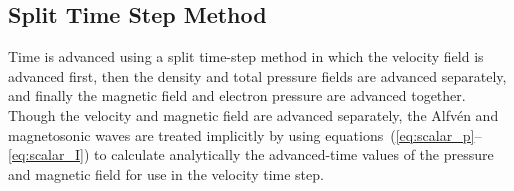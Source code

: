 \documentclass[letterpaper]{book}
\begin{document}
\subsection{Split Time Step Method}



Time is advanced using a split time-step method in which the velocity
field is advanced first, then the density and total pressure fields
are advanced separately, and finally the magnetic field and electron
pressure are advanced together.  Though the velocity and magnetic
field are advanced separately, the Alfv\'en and magnetosonic waves are
treated implicitly by using
equations~(\ref{eq:scalar_p}--\ref{eq:scalar_I}) to calculate
analytically the advanced-time values of the pressure and magnetic
field for use in the velocity time step.
\end{document}
